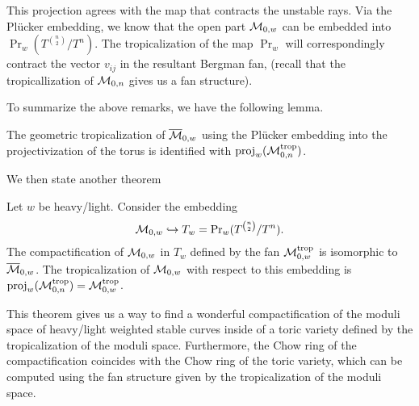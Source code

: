     This projection agrees with the map that contracts the unstable rays. 
    Via the Pl\"{u}cker embedding,
    we know that the open part $\mathcal{M}_{0, w}$ can be embedded into $\Pr_w(T^{\binom{n}{2}}/T^n)$. 
    The tropicalization of the map $\Pr_w$ 
    will correspondingly contract the vector $v_{ij}$ in the resultant Bergman fan, (recall that the tropicallization of $\mathcal{M}_{0, n}$ gives us a fan structure). 
    
    To summarize the above remarks, 
    we have the following lemma.
    \begin{lemma}
        The geometric tropicalization of $\overline{\mathcal{M}}_{0, w}$ using the Pl\"{u}cker embedding into the projectivization of the torus is identified with $\operatorname{proj}_w(\mathcal{M}_{0, n}^{\operatorname{trop}})$.
    \end{lemma}
    We then state another theorem
    \begin{theorem}
    \label{thm:tropical-compactification-m-0w}
        Let $w$ be heavy/light.
        Consider the embedding
        \[
        \mathcal{M}_{0, w} \hookrightarrow T_w = \operatorname{Pr}_w(T^{\binom{n}{2}}/T^n).
        \]
        The compactification of $\mathcal{M}_{0, w}$ in $T_w$ defined by the fan $\mathcal{M}_{0, w}^{\operatorname{trop}}$ is isomorphic to $\overline{\mathcal{M}}_{0, w}$.
        The tropicalization of $\mathcal{M}_{0, w}$ with respect to this embedding is $\operatorname{proj}_w(\mathcal{M}_{0, n}^{\operatorname{trop}}) = \mathcal{M}_{0, w}^{\operatorname{trop}}$.
    \end{theorem}
    
    This theorem gives us a way to find a wonderful compactification of the moduli space of heavy/light weighted stable curves inside of a toric variety defined by the tropicalization of the moduli space.
    Furthermore, the Chow ring of the compactification coincides with the Chow ring of the toric variety,
    which can be computed using the fan structure given by the tropicalization of the moduli space.
    